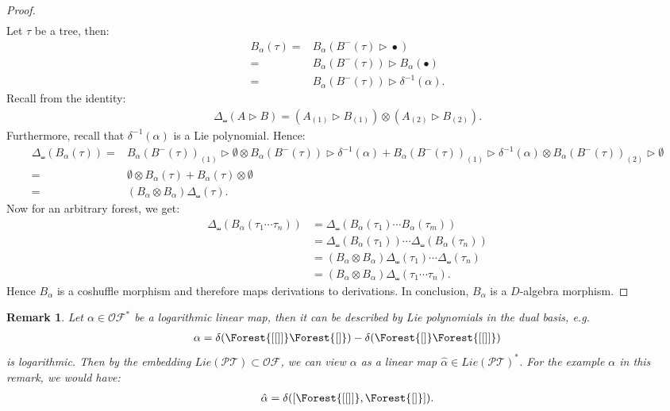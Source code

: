 \documentclass[10pt,a4paper]{article}
\newtheorem{remark}{Remark}
\DeclareMathOperator{\graft}{\triangleright}
\begin{document}
\begin{proof}
\begin{align*}
\end{align*}
Let $\tau$ be a tree, then:
\begin{align*}
B_{\alpha}(\tau)=&B_{\alpha}(B^-(\tau) \graft \bullet) \\
=&B_{\alpha}(B^-(\tau)) \graft B_{\alpha}(\bullet) \\
=&B_{\alpha}(B^-(\tau))\graft \delta^{-1}(\alpha).
\end{align*}
Recall from \cite{Ebrahimi-FardLundervoldMunthe-Kaas2014} the identity:
\begin{align*}
\Delta_{\shuffle}(A \graft B)=(A_{(1)} \graft B_{(1)}) \otimes (A_{(2)} \graft B_{(2)}).
\end{align*}
Furthermore, recall that $\delta^{-1}(\alpha)$ is a Lie polynomial. Hence:
\begin{align*}
\Delta_{\shuffle}(B_{\alpha}(\tau))=&B_{\alpha}(B^-(\tau))_{(1)}\graft \emptyset \otimes B_{\alpha}(B^-(\tau)) \graft \delta^{-1}(\alpha) + B_{\alpha}(B^-(\tau))_{(1)} \graft \delta^{-1}(\alpha) \otimes B_{\alpha}(B^-(\tau))_{(2)} \graft \emptyset \\
=& \emptyset \otimes B_{\alpha}(\tau) + B_{\alpha}(\tau) \otimes \emptyset \\
=&(B_{\alpha} \otimes B_{\alpha})\Delta_{\shuffle}(\tau).
\end{align*}
Now for an arbitrary forest, we get:
\begin{align*}
\Delta_{\shuffle}(B_{\alpha}(\tau_1 \cdots \tau_n))
&= \Delta_{\shuffle}(B_{\alpha}(\tau_1)\cdots B_{\alpha}(\tau_m)) \\
&= \Delta_{\shuffle}(B_{\alpha}(\tau_1)) \cdots \Delta_{\shuffle}(B_{\alpha}(\tau_n)) \\
&= (B_{\alpha} \otimes B_{\alpha})\Delta_{\shuffle}(\tau_1)\cdots\Delta_{\shuffle}(\tau_n) \\
&= (B_{\alpha} \otimes B_{\alpha})\Delta_{\shuffle}(\tau_1 \cdots \tau_n).
\end{align*}
Hence $B_{\alpha}$ is a coshuffle morphism and therefore maps derivations to derivations. In conclusion, $B_{\alpha}$ is a $D$-algebra morphism.
\end{proof}

\begin{remark}
Let $\alpha \in \mathcal{OF}^{\ast}$ be a logarithmic linear map, then it can be described by Lie polynomials in the dual basis, e.g.
\begin{align*}
\alpha=\delta(\Forest{[[]]}\Forest{[]})-\delta(\Forest{[]}\Forest{[[]]})
\end{align*}
is logarithmic. Then by the embedding $Lie(\mathcal{PT})\subset \mathcal{OF}$, we can view $\alpha$ as a linear map $\hat{\alpha}\in Lie(\mathcal{PT})^{\ast}$. For the example $\alpha$ in this remark, we would have:
\begin{align*}
\hat{\alpha}=\delta([\Forest{[[]]},\Forest{[]}]).
\end{align*}
\end{remark}
\end{document}
